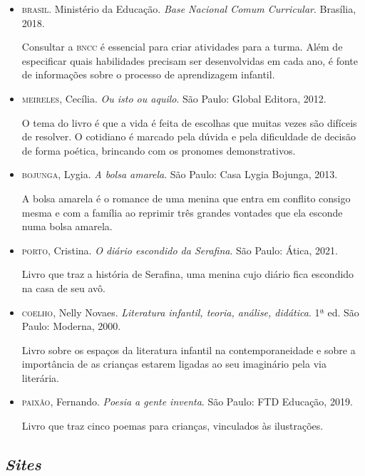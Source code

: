 \documentclass[11pt]{extarticle}
\begin{document}
\begin{itemize}
\item \textsc{brasil}. Ministério da Educação. \textit{Base Nacional Comum Curricular}. Brasília, 2018.

Consultar a \textsc{bncc} é essencial para criar atividades para a turma. Além de especificar quais habilidades precisam ser desenvolvidas em cada ano, é fonte de informações sobre o processo de aprendizagem infantil. 

\item \textsc{meireles}, Cecília. \textit{Ou isto ou aquilo}. São Paulo: Global Editora, 2012.

O tema do livro é que a vida é feita de escolhas que muitas vezes são difíceis de resolver. O cotidiano é marcado pela dúvida e pela dificuldade de decisão de forma poética, brincando com os pronomes demonstrativos.

\item \textsc{bojunga}, Lygia. \textit{A bolsa amarela}. São Paulo: Casa Lygia Bojunga, 2013.

A bolsa amarela é o romance de uma menina que entra em conflito consigo mesma e com a família ao reprimir três grandes vontades que ela esconde numa bolsa amarela.

\item \textsc{porto}, Cristina. \textit{O diário escondido da Serafina}. São Paulo: Ática, 2021.

Livro que traz a história de Serafina, uma menina cujo diário fica escondido na casa de seu avô.

\item \textsc{coelho}, Nelly Novaes. \textit{Literatura infantil, teoria, análise, didática}. 1ª ed. São Paulo: Moderna, 2000.

Livro sobre os espaços da literatura infantil na contemporaneidade e sobre a importância de as crianças estarem ligadas ao seu imaginário pela via literária.

\item \textsc{paixão}, Fernando. \textit{Poesia a gente inventa}. São Paulo: FTD Educação, 2019.

Livro que traz cinco poemas para crianças, vinculados às ilustrações.

\end{itemize}

\subsection{\textit{Sites}}
\end{document}
